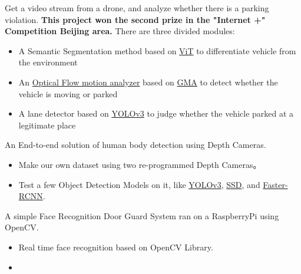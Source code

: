 \documentclass{resume}
\begin{document}
Get a video stream from a drone, and analyze whether there is a parking violation.  \textbf{This project won the second prize in the "Internet +" Competition Beijing area.} There are three divided modules:
\begin{itemize}
  \item A Semantic Segmentation method based on \href{https://arxiv.org/abs/2205.08534v3}{ViT} to differentiate vehicle from the environment
  \item An \href{https://github.com/open-mmlab/mmflow}{Optical Flow motion analyzer} based on \href{https://arxiv.org/abs/2104.02409}{GMA} to detect whether the vehicle is moving or parked
  \item A lane detector based on \href{https://arxiv.org/abs/1804.02767}{YOLOv3} to judge whether the vehicle parked at a legitimate place
\end{itemize}

An End-to-end solution of human body detection using Depth Cameras.
\begin{itemize}
  \item Make our own dataset using two re-programmed Depth Cameras。 
  \item Test a few Object Detection Models on it, like \href{https://arxiv.org/abs/1804.02767}{YOLOv3}, \href{https://arxiv.org/abs/1512.02325v5}{SSD}, and \href{https://arxiv.org/abs/1506.01497v3}{Faster-RCNN}.
\end{itemize}

A simple Face Recognition Door Guard System ran on a RaspberryPi using OpenCV.
\begin{itemize}
  \item Real time face recognition based on OpenCV Library. 
  \item {}
\end{itemize}
\end{document}
